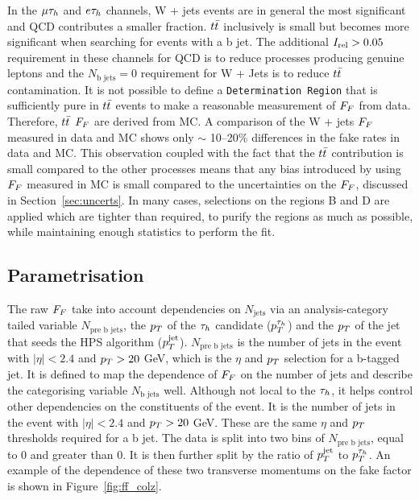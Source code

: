 In the $\mu\tau_{h}$ and $e\tau_{h}$ channels, W + jets \jtth events are in general the most significant and \ac{QCD} contributes a smaller fraction. 
$t\bar{t}$ inclusively is small but becomes more significant when searching for events with a b jet. 
The additional $I_{\text{rel}}>0.05$ requirement in these channels for \ac{QCD} is to reduce processes producing genuine leptons and the $N_{\text{b jets}}=0$ requirement for W + Jets is to reduce $t\bar{t}$ contamination.
It is not possible to define a \texttt{Determination Region} that is sufficiently pure in $t\bar{t}$ events to make a reasonable measurement of $F_{F}$ from data.
Therefore, $t\bar{t}$ $F_{F}$ are derived from \ac{MC}. 
A comparison of the W + jets $F_{F}$ measured in data and \ac{MC} shows only $\sim$ 10--20\% differences in the fake rates in data and \ac{MC}.  
This observation coupled with the fact that the $t\bar{t}$ contribution is small compared to the other processes means that any bias introduced by using $F_{F}$ measured in \ac{MC} is small compared to the uncertainties on the $F_{F}$, discussed in Section~\ref{sec:uncerts}. 
In many cases, selections on the regions B and D are applied which are tighter than required, to purify the regions as much as possible, while maintaining enough statistics to perform the fit.\\


\subsection{Parametrisation}
\label{sec:ff_params}

The raw $F_{F}$ take into account dependencies on $N_{\text{jets}}$ via an analysis-category tailed variable $N_{\text{pre b jets}}$, the $p_{T}$ of the $\tau_{h}$ candidate ($p_{T}^{\tau_{h}}$) and the $p_{T}$ of the jet that seeds the \ac{HPS} algorithm ($p_{T}^{\text{jet}}$).
$N_{\text{pre b jets}}$ is the number of jets in the event with $|\eta|<2.4$ and $p_{T}>20$ GeV, which is the $\eta$ and $p_{T}$ selection for a b-tagged jet. 
It is defined to map the dependence of $F_{F}$ on the number of jets and describe the categorising variable $N_{\text{b jets}}$ well.
Although not local to the $\tau_{h}$, it helps control other dependencies on the constituents of the event.
It is the number of jets in the event with $|\eta|<2.4$ and $p_{T}>20$ GeV. 
These are the same $\eta$ and $p_{T}$ thresholds required for a b jet.
The data is split into two bins of $N_{\text{pre b jets}}$, equal to 0 and greater than 0.
It is then further split by the ratio of $p_{T}^{\text{jet}}$ to $p_{T}^{\tau_{h}}$.
An example of the dependence of these two transverse momentums on the fake factor is shown in Figure~\ref{fig:ff_colz}. \\

